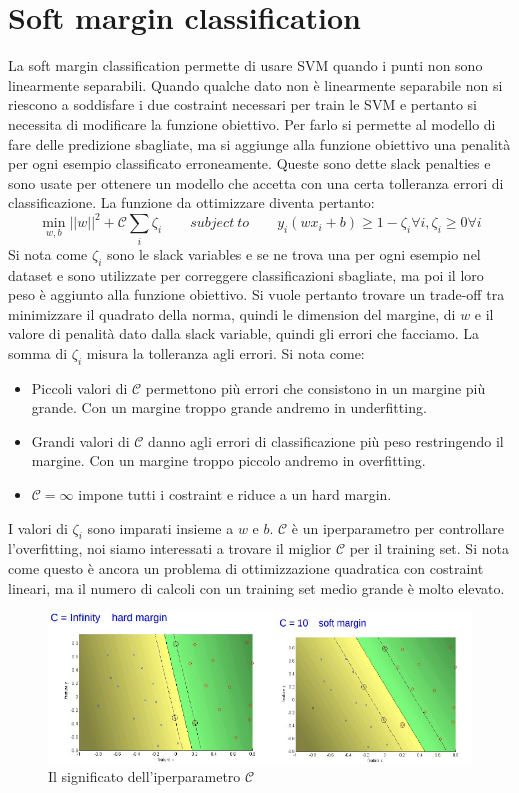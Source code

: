 \section{Soft margin classification}
La soft margin classification permette di usare SVM quando i punti non sono linearmente separabili.
Quando qualche dato non \`e linearmente separabile non si riescono a soddisfare i due costraint necessari per train le SVM e pertanto si necessita di modificare la funzione obiettivo.
Per farlo si permette al modello di fare delle predizione sbagliate, ma si aggiunge alla funzione obiettivo una penalit\`a per ogni esempio classificato erroneamente.
Queste sono dette slack penalties e sono usate per ottenere un modello che accetta con una certa tolleranza errori di classificazione.
La funzione da ottimizzare diventa pertanto:
$$\min_{w,b}||w||^2+\mathcal{C}\sum_i\zeta_i\qquad subject\ to\qquad y_i(wx_i+b)\ge 1 -\zeta_i\forall i, \zeta_i \ge 0 \forall i$$
Si nota come $\zeta_i$ sono le slack variables e se ne trova una per ogni esempio nel dataset e sono utilizzate per correggere classificazioni sbagliate, ma poi il loro peso \`e aggiunto alla funzione obiettivo.
Si vuole pertanto trovare un trade-off tra minimizzare il quadrato della norma, quindi le dimension del margine, di $w$ e il valore di penalit\`a dato dalla slack variable, quindi gli errori che facciamo.
La somma di $\zeta_i$ misura la tolleranza agli errori.
Si nota come:
\begin{multicols}{2}
	\begin{itemize}
		\item Piccoli valori di $\mathcal{C}$ permettono pi\`u errori che consistono in un margine pi\`u grande. 
		Con un margine troppo grande andremo in underfitting.
		\item Grandi valori di $\mathcal{C}$ danno agli errori di classificazione pi\`u peso restringendo il margine. 
		Con un margine troppo piccolo andremo in overfitting.
		\item $\mathcal{C} = \infty$ impone tutti i costraint e riduce a un hard margin.
	\end{itemize}
\end{multicols}
I valori di $\zeta_i$ sono imparati insieme a $w$ e $b$.
$\mathcal{C}$ \`e un iperparametro per controllare l'overfitting, noi siamo interessati a trovare il miglior $\mathcal{C}$ per il training set.
Si nota come questo \`e ancora un problema di ottimizzazione quadratica con costraint lineari, ma il numero di calcoli con un training set medio grande \`e molto elevato.
\begin{figure}
	\centering
	\includegraphics[width=0.6\linewidth]{imgs/chapter10/img1}
	\caption{Il significato dell'iperparametro $\mathcal{C}$}
	\label{fig:chapter10-01}
\end{figure}

